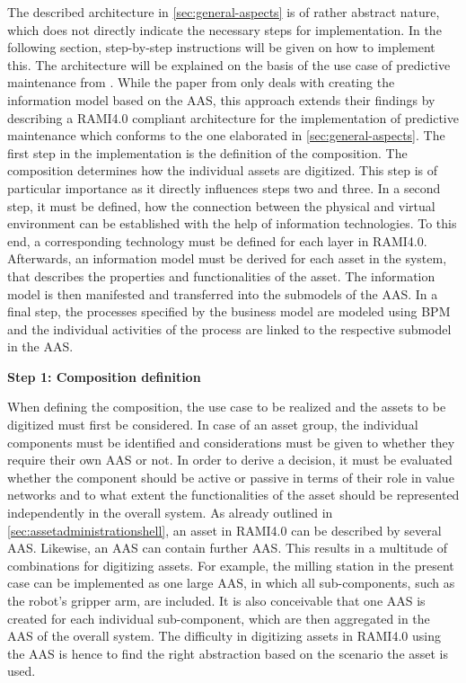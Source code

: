 The described architecture in \ref{sec:general-aspects} is of rather abstract nature, which does not directly indicate the necessary steps for implementation. In the following section, step-by-step instructions will be given on how to implement this. The architecture will be explained on the basis of the use case of predictive maintenance from \citeauthor{Cavalieri2020AShell}. While the paper from \citeauthor{Cavalieri2020AShell} only deals with creating the information model based on the \ac{AAS}, this approach extends their findings by describing a \ac{RAMI4.0} compliant architecture for the implementation of predictive maintenance which conforms to the one elaborated in \ref{sec:general-aspects}. The first step in the implementation is the definition of the composition. The composition determines how the individual assets are digitized. This step is of particular importance as it directly influences steps two and three. In a second step, it must be defined, how the connection between the physical and virtual environment can be established with the help of information technologies. To this end, a corresponding technology must be defined for each layer in \ac{RAMI4.0}. Afterwards, an information model must be derived for each asset in the system,  that describes the properties and functionalities of the asset. The information model is then manifested and transferred into the submodels of the \ac{AAS}. In a final step, the processes specified by the business model are modeled using \ac{BPM} and the individual activities of the process are linked to the respective submodel in the \ac{AAS}.

\textbf{Step 1: Composition definition}

When defining the composition, the use case to be realized and the assets to be digitized must first be considered. In case of an asset group, the individual components must be identified and considerations must be given to whether they require their own \ac{AAS} or not. In order to derive a decision, it must be evaluated whether the component should be active or passive in terms of their role in value networks and to what extent the functionalities of the asset should be represented independently in the overall system. As already outlined in \ref{sec:assetadministrationshell}, an asset in \ac{RAMI4.0} can be described by several \ac{AAS}. Likewise, an \ac{AAS} can contain further \ac{AAS}. This results in a multitude of combinations for digitizing assets. For example, the milling station in the present case can be implemented as one large \ac{AAS}, in which all sub-components, such as the robot's gripper arm, are included. It is also conceivable that one \ac{AAS} is created for each individual sub-component, which are then aggregated in the \ac{AAS} of the overall system. The difficulty in digitizing assets in \ac{RAMI4.0} using the \ac{AAS} is hence to find the right abstraction based on the scenario the asset is used. 

